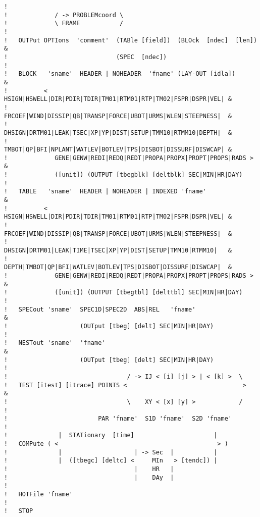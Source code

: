 \documentclass[12pt]{book}
\begin{document}
\begin{verbatim}
!
!             / -> PROBLEMcoord \
!             \ FRAME           /
!
!   OUTPut OPTIons  'comment'  (TABle [field])  (BLOck  [ndec]  [len])      &
!                              (SPEC  [ndec])
!
!   BLOCK   'sname'  HEADER | NOHEADER  'fname' (LAY-OUT [idla])            &
!          <  HSIGN|HSWELL|DIR|PDIR|TDIR|TM01|RTM01|RTP|TM02|FSPR|DSPR|VEL| &
!             FRCOEF|WIND|DISSIP|QB|TRANSP|FORCE|UBOT|URMS|WLEN|STEEPNESS|  &
!             DHSIGN|DRTM01|LEAK|TSEC|XP|YP|DIST|SETUP|TMM10|RTMM10|DEPTH|  &
!             TMBOT|QP|BFI|NPLANT|WATLEV|BOTLEV|TPS|DISBOT|DISSURF|DISWCAP| &
!             GENE|GENW|REDI|REDQ|REDT|PROPA|PROPX|PROPT|PROPS|RADS >       &
!             ([unit]) (OUTPUT [tbegblk] [deltblk] SEC|MIN|HR|DAY)
!
!   TABLE   'sname'  HEADER | NOHEADER | INDEXED 'fname'                    &
!          <  HSIGN|HSWELL|DIR|PDIR|TDIR|TM01|RTM01|RTP|TM02|FSPR|DSPR|VEL| &
!             FRCOEF|WIND|DISSIP|QB|TRANSP|FORCE|UBOT|URMS|WLEN|STEEPNESS|  &
!             DHSIGN|DRTM01|LEAK|TIME|TSEC|XP|YP|DIST|SETUP|TMM10|RTMM10|   &
!             DEPTH|TMBOT|QP|BFI|WATLEV|BOTLEV|TPS|DISBOT|DISSURF|DISWCAP|  &
!             GENE|GENW|REDI|REDQ|REDT|PROPA|PROPX|PROPT|PROPS|RADS >       &
!             ([unit]) (OUTPUT [tbegtbl] [delttbl] SEC|MIN|HR|DAY)
!
!   SPECout 'sname'  SPEC1D|SPEC2D  ABS|REL   'fname'                       &
!                    (OUTput [tbeg] [delt] SEC|MIN|HR|DAY)
!
!   NESTout 'sname'  'fname'                                                &
!                    (OUTput [tbeg] [delt] SEC|MIN|HR|DAY)
!
!                                 / -> IJ < [i] [j] > | < [k] >  \
!   TEST [itest] [itrace] POINTS <                                >         &
!                                 \    XY < [x] [y] >            /
!
!                         PAR 'fname'  S1D 'fname'  S2D 'fname'
!
!              |  STATionary  [time]                      |
!   COMPute ( <                                            > )
!              |                    | -> Sec  |           |
!              |  ([tbegc] [deltc] <     MIn   > [tendc]) |
!                                   |    HR   |
!                                   |    DAy  |
!
!   HOTFile 'fname'
!
!   STOP
\end{verbatim}

 \label{app:spcform}
\end{document}
